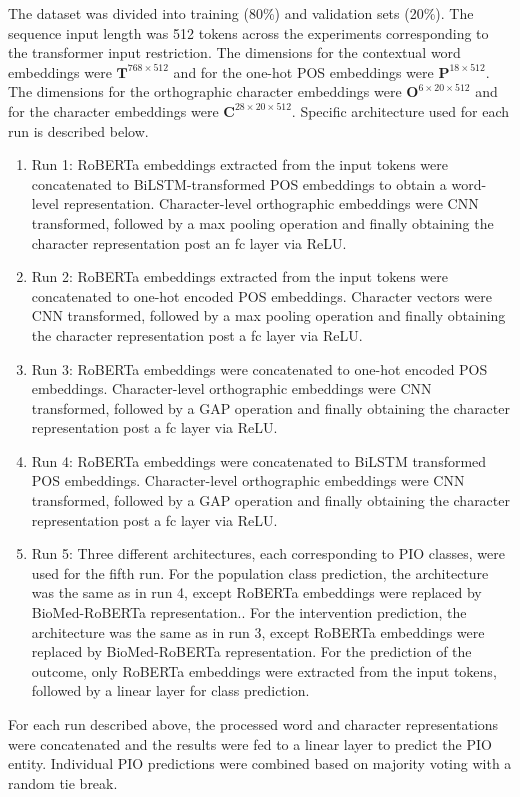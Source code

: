 \documentclass[11pt]{article}
\begin{document}
The dataset was divided into training (80\%) and validation sets (20\%).
The sequence input length was 512 tokens across the experiments corresponding to the transformer input restriction.
The dimensions for the contextual word embeddings were $\mathbf{T}^{768 \times 512}$ and for the one-hot POS embeddings were $\mathbf{P}^{18 \times 512}$.
The dimensions for the orthographic character embeddings were $\mathbf{O}^{6 \times 20 \times 512}$ and for the character embeddings were $\mathbf{C}^{28 \times 20 \times 512}$.
Specific architecture used for each run is described below.
%
\begin{enumerate}
    \item Run 1: RoBERTa embeddings extracted from the input tokens were concatenated to BiLSTM-transformed POS embeddings to obtain a word-level representation. Character-level orthographic embeddings were CNN transformed, followed by a max pooling operation and finally obtaining the character representation post an fc layer via ReLU. 
    \item Run 2: RoBERTa embeddings extracted from the input tokens were concatenated to one-hot encoded POS embeddings. Character vectors were CNN transformed, followed by a max pooling operation and finally obtaining the character representation post a fc layer via ReLU.
    \item Run 3: RoBERTa embeddings were concatenated to one-hot encoded POS embeddings. Character-level orthographic embeddings were CNN transformed, followed by a GAP operation and finally obtaining the character representation post a fc layer via ReLU.
    \item Run 4: RoBERTa embeddings were concatenated to BiLSTM transformed POS embeddings. Character-level orthographic embeddings were CNN transformed, followed by a GAP operation and finally obtaining the character representation post a fc layer via ReLU.
    \item Run 5: Three different architectures, each corresponding to PIO classes, were used for the fifth run. For the population class prediction, the architecture was the same as in run 4, except RoBERTa embeddings were replaced by BioMed-RoBERTa representation.. For the intervention prediction, the architecture was the same as in run 3, except RoBERTa embeddings were replaced by BioMed-RoBERTa representation. For the prediction of the outcome, only RoBERTa embeddings were extracted from the input tokens, followed by a linear layer for class prediction. 
\end{enumerate}
%
For each run described above, the processed word and character representations were concatenated and the results were fed to a linear layer to predict the PIO entity.
Individual PIO predictions were combined based on majority voting with a random tie break.
%
%
%
\end{document}

